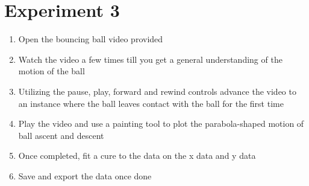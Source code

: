 \section{{Experiment 3}}

{}

\begin{enumerate}
	\item {Open the bouncing ball video provided}
	\item {Watch the video a few times till you get a general understanding of the motion of the ball}
	\item {Utilizing the pause, play, forward and rewind controls advance the video to an instance where the ball leaves contact with the ball for the first time}
	\item {Play the video and use a painting tool to plot the parabola-shaped motion of ball ascent and descent}
	\item {Once completed, fit a cure to the data on the x data and y data}
	\item {Save and export the data once done}
\end{enumerate}
